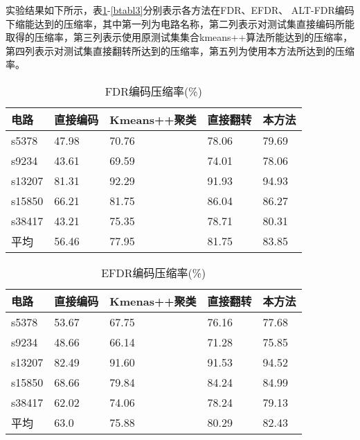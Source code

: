 实验结果如下所示，表\ref{btabl1}-\ref{btabl3}分别表示各方法在FDR、EFDR、 ALT-FDR编码下缩能达到的压缩率，其中第一列为电路名称，第二列表示对测试集直接编码所能取得的压缩率，第三列表示使用原测试集集合kmeans++算法所能达到的压缩率，第四列表示对测试集直接翻转所达到的压缩率，第五列为使用本方法所达到的压缩率。

\begin{table}[H]
\centering
\caption{FDR编码压缩率(\%)}\label{btabl1}
\begin{tabular}{p{2.2cm}p{2.7cm}<{\centering}p{3.3cm}<{\centering}p{2.7cm}<{\centering}p{2.7cm}<{\centering}}
\toprule
\textbf{电路}&	\textbf{直接编码}& \textbf{Kmeans++聚类}& \textbf{直接翻转}& \textbf{本方法}\\
\midrule
s5378&	47.98&	70.76&	78.06&	79.69\\
s9234&	43.61&	69.59&	74.01&	78.06\\
s13207&	81.31&	92.29&	91.93&	94.93\\
s15850&	66.21&	81.75&	86.04&	86.27\\
s38417&	43.21&	75.35&	78.71&	80.31\\
平均&	56.46&	77.95&	81.75&	83.85\\
\bottomrule
\end{tabular}
\end{table}

\begin{table}[H]
\centering
\caption{EFDR编码压缩率(\%)}\label{btabl2}
\begin{tabular}{p{2.2cm}p{2.7cm}<{\centering}p{3.3cm}<{\centering}p{2.7cm}<{\centering}p{2.7cm}<{\centering}}
\toprule
\textbf{电路}&	\textbf{直接编码}& \textbf{Kmenas++聚类}& \textbf{直接翻转}& \textbf{本方法}\\
\midrule
s5378&	53.67&	67.75&	76.16&	77.68\\
s9234&	48.66&	66.14&	71.28&	75.85\\
s13207&	82.49&	91.60&	91.53&	94.52\\
s15850&	68.66&	79.84&	84.24&	84.99\\
s38417&	62.02&	74.06&	78.24&	79.13\\
平均&	63.0&	75.88&	80.29&	82.43\\
\bottomrule
\end{tabular}
\end{table}

